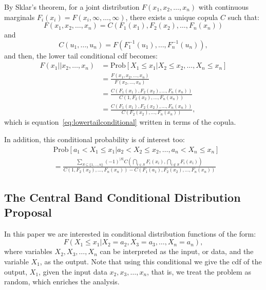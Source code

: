 \documentclass[
	11pt, %
	fleqn, %
	a4paper, %
]{LegrandOrangeBook}
\begin{document}
By Sklar's theorem, for a joint distribution $F(x_1, x_2,\ldots, x_n)$ with continuous marginals $F_i(x_i) = F(x_i,\infty,\ldots,\infty)$, there exists a unique copula $C$ such that:
\begin{equation}
F(x_1, x_2,\ldots, x_n) = C(F_1(x_1),F_2(x_2),\ldots,F_n(x_n))
\label{eq:sklarapplication}
\end{equation}
and
\begin{equation}
C(u_1,\ldots,u_n) = F(F_1^{-1}(u_1),\ldots,F_n^{-1}(u_n)),
\label{eq:copulainverse}
\end{equation}
and then, the lower tail conditional cdf becomes:
\begin{align}
F(x_1 || x_2,\ldots, x_n) &= \text{Prob}[X_1 \leq x_1|X_2 \leq x_2,\ldots,X_n \leq x_n] \nonumber\\
&= \frac{F(x_1, x_2,\ldots, x_n)}{F(x_2,\ldots, x_n)} \nonumber\\
&= \frac{C(F_1(x_1),F_2(x_2),\ldots,F_n(x_n))}{C(1,F_2(x_2),\ldots,F_n(x_n))} \nonumber\\
&= \frac{C(F_1(x_1),F_2(x_2),\ldots,F_n(x_n))}{C(F_2(x_2),\ldots,F_n(x_n))},
\label{eq:copulaconditional}
\end{align}
which is equation~\eqref{eq:lowertailconditional} written in terms of the copula.

In addition, this conditional probability is of interest too:
\begin{align}
&\text{Prob}[a_1 < X_1 \leq x_1 | a_2 < X_2 \leq x_2,\ldots, a_n < X_n \leq x_n] \nonumber\\
&= \frac{\sum_{S \subseteq \{1,\ldots, n\}} (-1)^{|S|} C\left( \bigcap_{i \in S} F_i(x_i), \bigcap_{i \notin S} F_i(x_i) \right)}{C(1,F_2(x_2),\ldots,F_n(x_n)) - C(F_1(a_1),F_2(x_2),\ldots,F_n(x_n))}
\end{align}
\subsection{The Central Band Conditional Distribution Proposal}

In this paper we are interested in conditional distribution functions of the form:
\begin{equation}
F(X_1 \leq x_1|X_2 = a_2, X_3 = a_3,\ldots, X_n = a_n),
\label{eq:pointconditional}
\end{equation}
where variables $X_2,X_3,\ldots,X_n$ can be interpreted as the input, or data, and the variable $X_1$, as the output. Note that using this conditional we give the cdf of the output, $X_1$, given the input data $x_2, x_3,\ldots, x_n$, that is, we treat the problem as random, which enriches the analysis.
\end{document}
